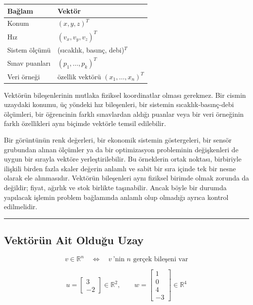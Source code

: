 \documentclass[
  a4paper,
  DIV=11,
  numbers=noendperiod]{scrartcl}
\begin{document}
\begin{longtable}[]{@{}ll@{}}
\toprule\noalign{}
Bağlam & Vektör \\
\midrule\noalign{}
\endhead
\bottomrule\noalign{}
\endlastfoot
Konum & \((x,y,z)^T\) \\
Hız & \((v_x,v_y,v_z)^T\) \\
Sistem ölçümü & (sıcaklık, basınç, debi)\(^T\) \\
Sınav puanları & \((p_1,\ldots,p_k)^T\) \\
Veri örneği & özellik vektörü \((x_1,\ldots,x_n)^T\) \\
\end{longtable}

Vektörün bileşenlerinin mutlaka fiziksel koordinatlar olması gerekmez.
Bir cismin uzaydaki konumu, üç yöndeki hız bileşenleri, bir sistemin
sıcaklık-basınç-debi ölçümleri, bir öğrencinin farklı sınavlardan aldığı
puanlar veya bir veri örneğinin farklı özellikleri aynı biçimde vektörle
temsil edilebilir.

Bir görüntünün renk değerleri, bir ekonomik sistemin göstergeleri, bir
sensör grubundan alınan ölçümler ya da bir optimizasyon probleminin
değişkenleri de uygun bir sırayla vektöre yerleştirilebilir. Bu
örneklerin ortak noktası, birbiriyle ilişkili birden fazla skaler
değerin anlamlı ve sabit bir sıra içinde tek bir nesne olarak ele
alınmasıdır. Vektörün bileşenleri aynı fiziksel birimde olmak zorunda da
değildir; fiyat, ağırlık ve stok birlikte taşınabilir. Ancak böyle bir
durumda yapılacak işlemin problem bağlamında anlamlı olup olmadığı
ayrıca kontrol edilmelidir.

\begin{center}\rule{0.5\linewidth}{0.5pt}\end{center}

\subsection{Vektörün Ait Olduğu
Uzay}\label{vektuxf6ruxfcn-ait-olduux11fu-uzay}

\[
v\in\mathbb{R}^n
\quad\Longleftrightarrow\quad
v\ \text{'nin } n \text{ gerçek bileşeni var}
\]

\[
u=\begin{bmatrix}3\\-2\end{bmatrix}\in\mathbb{R}^2,
\qquad
w=\begin{bmatrix}1\\0\\4\\-3\end{bmatrix}\in\mathbb{R}^4
\]
\end{document}
